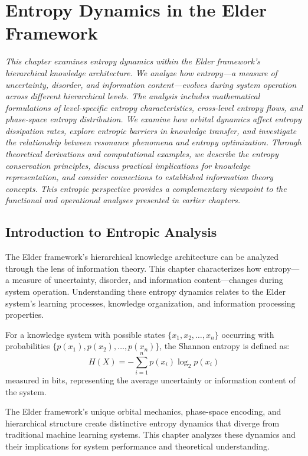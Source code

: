 \chapter{Entropy Dynamics in the Elder Framework}

\textit{This chapter examines entropy dynamics within the Elder framework's hierarchical knowledge architecture. We analyze how entropy—a measure of uncertainty, disorder, and information content—evolves during system operation across different hierarchical levels. The analysis includes mathematical formulations of level-specific entropy characteristics, cross-level entropy flows, and phase-space entropy distribution. We examine how orbital dynamics affect entropy dissipation rates, explore entropic barriers in knowledge transfer, and investigate the relationship between resonance phenomena and entropy optimization. Through theoretical derivations and computational examples, we describe the entropy conservation principles, discuss practical implications for knowledge representation, and consider connections to established information theory concepts. This entropic perspective provides a complementary viewpoint to the functional and operational analyses presented in earlier chapters.}

\section{Introduction to Entropic Analysis}

The Elder framework's hierarchical knowledge architecture can be analyzed through the lens of information theory. This chapter characterizes how entropy—a measure of uncertainty, disorder, and information content—changes during system operation. Understanding these entropy dynamics relates to the Elder system's learning processes, knowledge organization, and information processing properties.

\begin{definition}
For a knowledge system with possible states $\{x_1, x_2, \ldots, x_n\}$ occurring with probabilities $\{p(x_1), p(x_2), \ldots, p(x_n)\}$, the Shannon entropy is defined as:
\begin{equation}
H(X) = -\sum_{i=1}^{n} p(x_i) \log_2 p(x_i)
\end{equation}
measured in bits, representing the average uncertainty or information content of the system.
\end{definition}

The Elder framework's unique orbital mechanics, phase-space encoding, and hierarchical structure create distinctive entropy dynamics that diverge from traditional machine learning systems. This chapter analyzes these dynamics and their implications for system performance and theoretical understanding.

